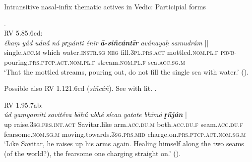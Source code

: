 \documentclass[output=paper,colorlinks,citecolor=brown]{langscibook}
\begin{document}
\largerpage
\begin{exe}
    \ex  Intransitive nasal-infix thematic actives in Vedic: Participial forms
    \begin{xlist}
        .\\
        
         RV 5.85.6cd:\\
         \gll  \textit{ékaṃ} \textit{yád} \textit{udn{ā́}} \textit{ná} \textit{pr̥ṇánti} \textit{énīr} {\textbf{\textit{ā-siñcántīr}} } \textit{avánayaḥ} {\textit{samudrám} ||}\\
         single.\textsc{acc.m} which water.\textsc{instr.sg} \textsc{neg} fill.\textsc{3pl.prs.act} mottled.\textsc{nom.pl.f} \textsc{prvb}-pouring.\textsc{prs.ptcp.act.nom.pl.f} stream.\textsc{nom.pl.f} sea.\textsc{acc.sg.m}\\
         \glt `That the mottled streams, pouring out, do not fill the single sea with water.' (\citealt{JamisonBrereton2014}).\\
         \smallskip
         
         { Possible also RV 1.121.6cd (\textit{siñcáñ}). See \citealt[92--95]{Hill2007} with lit.}
.\\
\smallskip

RV 1.95.7ab:\\
\gll \textit{úd} \textit{yaṃyamīti} \textit{savitéva} \textit{bāhū́}  \textit{ubhé} \textit{sícau} \textit{yatate} \textit{bhīmá}  {\textbf{\textit{r̥ñján}} |}\\ 
up raise.\textsc{3sg.prs.int.act} Savitar.like arm.\textsc{acc.du.m} both.\textsc{acc.du.f} seam.\textsc{acc.du.f} fearsome.\textsc{nom.sg.m} moving.towards.\textsc{3sg.prs.mid} charge.on.\textsc{prs.ptcp.act.nom.sg.m}\\
\glt `Like Savitar, he raises up his arms again. Healing himself along the two seams (of the world?), the fearsome one charging straight on.' (\citealt{JamisonBrereton2014}).\\
\smallskip


\end{xlist}
\end{exe}
\end{document}

